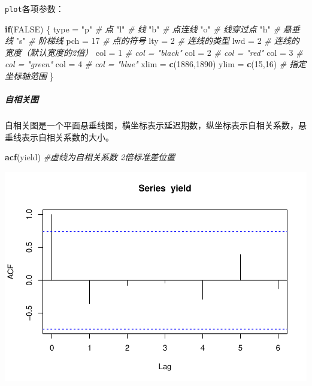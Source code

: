 \documentclass[]{article}
\newenvironment{Shaded}{\begin{snugshade}}{\end{snugshade}}
\newcommand{\CommentTok}[1]{\textcolor[rgb]{0.56,0.35,0.01}{\textit{#1}}}
\newcommand{\ControlFlowTok}[1]{\textcolor[rgb]{0.13,0.29,0.53}{\textbf{#1}}}
\newcommand{\DecValTok}[1]{\textcolor[rgb]{0.00,0.00,0.81}{#1}}
\newcommand{\KeywordTok}[1]{\textcolor[rgb]{0.13,0.29,0.53}{\textbf{#1}}}
\newcommand{\NormalTok}[1]{#1}
\newcommand{\OtherTok}[1]{\textcolor[rgb]{0.56,0.35,0.01}{#1}}
\newcommand{\StringTok}[1]{\textcolor[rgb]{0.31,0.60,0.02}{#1}}
\let\oldsubparagraph\subparagraph
\renewcommand{\subparagraph}[1]{\oldsubparagraph{#1}\mbox{}}
\begin{document}
\texttt{plot}各项参数：

\begin{Shaded}
\begin{Highlighting}[]
\ControlFlowTok{if}\NormalTok{(}\OtherTok{FALSE}\NormalTok{) \{}
\NormalTok{  type =}\StringTok{ "p"}  \CommentTok{# 点}
         \StringTok{"l"}  \CommentTok{# 线}
         \StringTok{"b"}  \CommentTok{# 点连线}
         \StringTok{"o"}  \CommentTok{# 线穿过点}
         \StringTok{"h"}  \CommentTok{# 悬垂线}
         \StringTok{"s"}  \CommentTok{# 阶梯线}
\NormalTok{  pch =}\StringTok{ }\DecValTok{17} \CommentTok{# 点的符号}
\NormalTok{  lty =}\StringTok{ }\DecValTok{2}  \CommentTok{# 连线的类型}
\NormalTok{  lwd =}\StringTok{ }\DecValTok{2}  \CommentTok{# 连线的宽度（默认宽度的2倍）}
\NormalTok{  col =}\StringTok{ }\DecValTok{1}  \CommentTok{# col = "black"}
\NormalTok{  col =}\StringTok{ }\DecValTok{2}  \CommentTok{# col = "red"}
\NormalTok{  col =}\StringTok{ }\DecValTok{3}  \CommentTok{# col = "green"}
\NormalTok{  col =}\StringTok{ }\DecValTok{4}  \CommentTok{# col = "blue"}
\NormalTok{  xlim =}\StringTok{ }\KeywordTok{c}\NormalTok{(}\DecValTok{1886}\NormalTok{,}\DecValTok{1890}\NormalTok{)}
\NormalTok{  ylim =}\StringTok{ }\KeywordTok{c}\NormalTok{(}\DecValTok{15}\NormalTok{,}\DecValTok{16}\NormalTok{) }\CommentTok{# 指定坐标轴范围}
\NormalTok{\}}
\end{Highlighting}
\end{Shaded}

\hypertarget{ux81eaux76f8ux5173ux56fe}{%
\subparagraph{自相关图}\label{ux81eaux76f8ux5173ux56fe}}

自相关图是一个平面悬垂线图，横坐标表示延迟期数，纵坐标表示自相关系数，悬垂线表示自相关系数的大小。

\begin{Shaded}
\begin{Highlighting}[]
\KeywordTok{acf}\NormalTok{(yield) }\CommentTok{#虚线为自相关系数 2倍标准差位置}
\end{Highlighting}
\end{Shaded}

\includegraphics{timeseries_files/figure-latex/unnamed-chunk-9-1.pdf}
\end{document}
